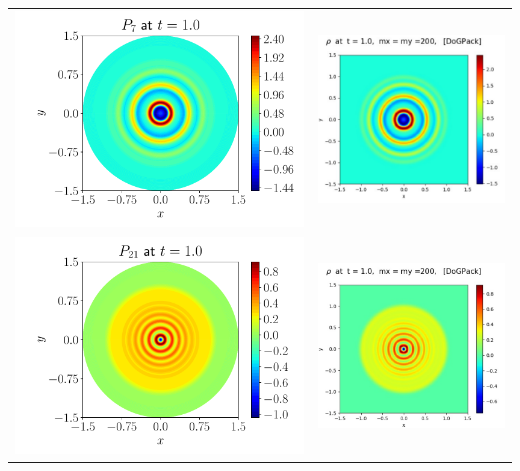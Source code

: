 \newpage
\FloatBarrier
\begin{center}
\begin{tabular}{c|c}                    
    \includegraphics[height=0.4\linewidth]{figures/physical_final_p7.pdf} &
    \includegraphics[height=0.4\linewidth]{figures/Minwoo_p7.png} \\
    \includegraphics[height=0.4\linewidth]{figures/physical_final_p21.pdf} &
    \includegraphics[height=0.4\linewidth]{figures/Minwoo_p21.png} \\

\end{tabular}
\end{center}
